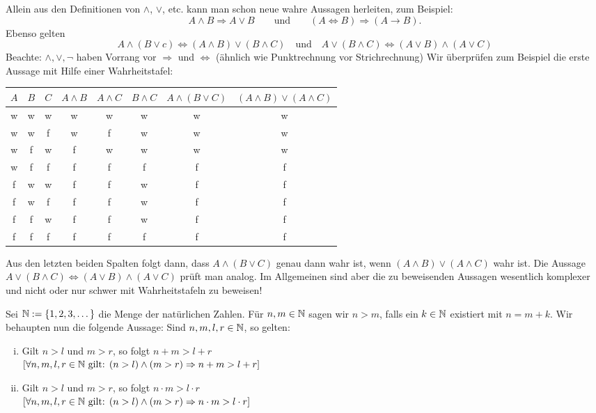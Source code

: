 Allein aus den Definitionen von $\wedge$, $\vee$, etc. kann man schon neue wahre Aussagen herleiten, zum Beispiel:
\[
	A \wedge B \Rightarrow A \vee B \qquad \text{und} \qquad (A \Leftrightarrow B) \Rightarrow (A \rightarrow B).
\]
Ebenso gelten
\[
	A \wedge (B \vee c) \Leftrightarrow (A \wedge B) \vee (B \wedge C) \quad \text{und} \quad A \vee (B \wedge C) \Leftrightarrow (A \vee B) \wedge (A \vee C)
\]
Beachte: $\wedge, \vee, \neg$ haben Vorrang vor $\Rightarrow$ und $\Leftrightarrow$ (ähnlich wie Punktrechnung vor Strichrechnung)
Wir überprüfen zum Beispiel die erste Aussage mit Hilfe einer Wahrheitstafel:

\begin{center}
	\begin{tabular}{cccccccc}
	$A$ & $B$ & $C$ & $A \wedge B$ & $A \wedge C$ & $B \wedge C$ & $A \wedge (B \vee C)$ & $(A \wedge B) \vee (A \wedge C)$ \\ 
	\hline 
	w & w & w & w & w & w & w & w \\ 
	\hline 
	w & w & f & w & f & w & w & w \\ 
	\hline 
	w & f & w & f & w & w & w & w \\ 
	\hline 
	w & f & f & f & f & f & f & f \\ 
	\hline 
	f & w & w & f & f & w & f & f \\ 
	\hline 
	f & w & f & f & f & w & f & f \\ 
	\hline 
	f & f & w & f & f & w & f & f \\ 
	\hline 
	f & f & f & f & f & f & f & f \\ 
\end{tabular} 
\end{center}

Aus den letzten beiden Spalten folgt dann, dass $A \wedge (B \vee C)$ genau dann wahr ist, wenn $(A \wedge B) \vee (A \wedge C)$ wahr ist. 
Die Aussage $A \vee (B \wedge C) \Leftrightarrow (A \vee B) \wedge (A \vee C)$ prüft man analog.
Im Allgemeinen sind aber die zu beweisenden Aussagen wesentlich komplexer und nicht oder nur schwer mit Wahrheitstafeln zu beweisen!

\begin{beispiel}
	\label{bsp:I.1.3}
	Sei $\mathbb{N}:= \{1,2,3,\dots\}$ die Menge der natürlichen Zahlen.
	Für $n,m \in \mathbb{N}$ sagen wir $n > m$, falls ein $k \in \mathbb{N}$ existiert mit $n = m+k$.
	Wir behaupten nun die folgende Aussage:
	Sind $n,m,l,r \in \mathbb{N}$, so gelten:
	\begin{enumerate}[(i)]
		\item Gilt $n > l$ und $m > r$, so folgt $n+m > l+r$ \\
		$[\forall n,m,l,r \in \mathbb{N} \text{ gilt: } (n > l) \wedge (m > r) \Rightarrow n+m > l+r]$
		\item Gilt $n > l$ und $m > r$, so folgt $n \cdot m > l \cdot r$ \\
		$[\forall n,m,l,r \in \mathbb{N} \text{ gilt: } (n > l) \wedge (m > r) \Rightarrow n \cdot m > l \cdot r]$
	\end{enumerate}
\end{beispiel}


